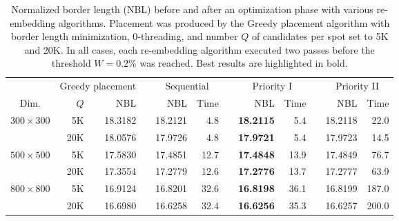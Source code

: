 \begin{table}[t]\centering
\caption{\label{tab:priority_bl}
  Normalized border length (NBL) before and after an optimization phase with
  various re-embedding algorithms. Placement was produced by the Greedy
  placement algorithm with border length minimization, $0$-threading, and number
  $Q$ of candidates per spot set to 5K and 20K. In all cases, each re-embedding
  algorithm executed two passes before the threshold $W=0.2\%$ was reached. Best
  results are highlighted in bold.}
\footnotesize{
\begin{tabular}{crrlrrlrrlrr}
\vspace{1pt}
     & \multicolumn{2}{c}{Greedy placement} & & \multicolumn{2}{c}{Sequential} & & \multicolumn{2}{c}{Priority I} & & \multicolumn{2}{c}{Priority II} \\ \cline{2-3} \cline{5-6} \cline{8-9} \cline{11-12}
\vspace{1pt}
Dim. & $Q$ & NBL & & NBL & Time & & NBL & Time & & NBL & Time \\
\hline
$300\times 300$ &  5K & 18.3182 &  & 18.2121 &  4.8 &  & {\bf 18.2115} &  5.4 &  & 18.2118 &  22.0 \\
                & 20K & 18.0576 &  & 17.9726 &  4.8 &  & {\bf 17.9721} &  5.4 &  & 17.9723 &  14.5 \\
\hline
$500\times 500$ &  5K & 17.5830 &  & 17.4851 & 12.7 &  & {\bf 17.4848} & 13.9 &  & 17.4849 &  76.7 \\
                & 20K & 17.3554 &  & 17.2779 & 12.6 &  & {\bf 17.2776} & 13.7 &  & 17.2777 &  63.9 \\
\hline
$800\times 800$ &  5K & 16.9124 &  & 16.8201 & 32.6 &  & {\bf 16.8198} & 36.1 &  & 16.8199 & 187.0 \\
                & 20K & 16.6980 &  & 16.6258 & 32.4 &  & {\bf 16.6256} & 35.3 &  & 16.6257 & 200.0 \\
\hline
\end{tabular}}
\end{table}

